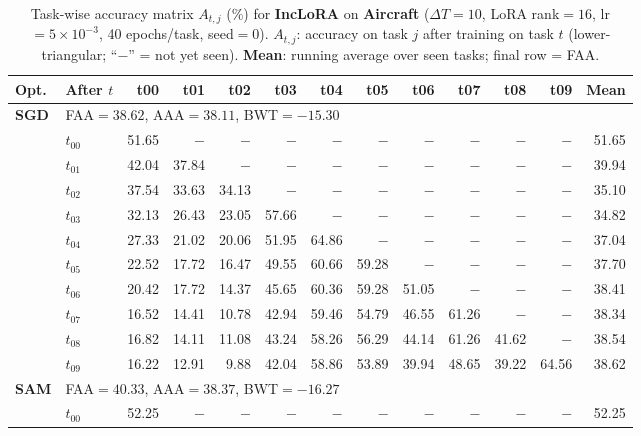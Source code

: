 \begin{table}[ht]
\centering
\caption{%
  Task-wise accuracy matrix $A_{t,j}$ (\%) for \textbf{IncLoRA} on \textbf{Aircraft} ($\Delta T=10$, LoRA rank$=16$, lr$=5\times10^{-3}$, 40 epochs/task, seed$=0$).
  $A_{t,j}$: accuracy on task $j$ after training on task $t$  (lower-triangular; ``$-$'' = not yet seen).
  \textbf{Mean}: running average over seen tasks; final row = FAA.
}
\label{tab:raw_inclora_aircraft}
\setlength{\tabcolsep}{2.8pt}
\renewcommand{\arraystretch}{0.88}
\scriptsize
\begin{tabular}{@{}l l r r r r r r r r r r r@{}}
\toprule
\textbf{Opt.} & \textbf{After $t$} & \textbf{t00} & \textbf{t01} & \textbf{t02} & \textbf{t03} & \textbf{t04} & \textbf{t05} & \textbf{t06} & \textbf{t07} & \textbf{t08} & \textbf{t09} & \textbf{Mean} \\
\midrule
\multirow{11}{*}{\textbf{SGD}} & \multicolumn{12}{l}{\quad\small FAA$=38.62$,\; AAA$=38.11$,\; BWT$=-15.30$} \\
 & $t_{00}$ & 51.65 & $-$ & $-$ & $-$ & $-$ & $-$ & $-$ & $-$ & $-$ & $-$ & 51.65 \\
 & $t_{01}$ & 42.04 & 37.84 & $-$ & $-$ & $-$ & $-$ & $-$ & $-$ & $-$ & $-$ & 39.94 \\
 & $t_{02}$ & 37.54 & 33.63 & 34.13 & $-$ & $-$ & $-$ & $-$ & $-$ & $-$ & $-$ & 35.10 \\
 & $t_{03}$ & 32.13 & 26.43 & 23.05 & 57.66 & $-$ & $-$ & $-$ & $-$ & $-$ & $-$ & 34.82 \\
 & $t_{04}$ & 27.33 & 21.02 & 20.06 & 51.95 & 64.86 & $-$ & $-$ & $-$ & $-$ & $-$ & 37.04 \\
 & $t_{05}$ & 22.52 & 17.72 & 16.47 & 49.55 & 60.66 & 59.28 & $-$ & $-$ & $-$ & $-$ & 37.70 \\
 & $t_{06}$ & 20.42 & 17.72 & 14.37 & 45.65 & 60.36 & 59.28 & 51.05 & $-$ & $-$ & $-$ & 38.41 \\
 & $t_{07}$ & 16.52 & 14.41 & 10.78 & 42.94 & 59.46 & 54.79 & 46.55 & 61.26 & $-$ & $-$ & 38.34 \\
 & $t_{08}$ & 16.82 & 14.11 & 11.08 & 43.24 & 58.26 & 56.29 & 44.14 & 61.26 & 41.62 & $-$ & 38.54 \\
 & $t_{09}$ & 16.22 & 12.91 & 9.88 & 42.04 & 58.86 & 53.89 & 39.94 & 48.65 & 39.22 & 64.56 & 38.62 \\
\midrule
\multirow{11}{*}{\textbf{SAM}} & \multicolumn{12}{l}{\quad\small FAA$=40.33$,\; AAA$=38.37$,\; BWT$=-16.27$} \\
 & $t_{00}$ & 52.25 & $-$ & $-$ & $-$ & $-$ & $-$ & $-$ & $-$ & $-$ & $-$ & 52.25 \\

\end{tabular}
\end{table}
